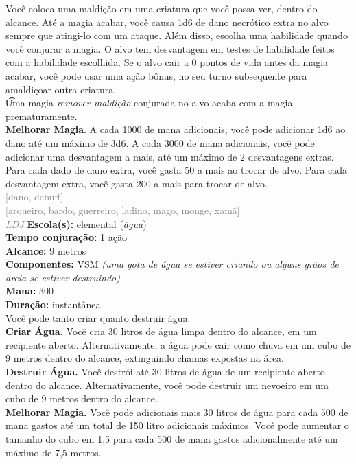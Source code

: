\documentclass{RPG_Adventure}[2021/10/20]
\begin{document}
{\normalsize Você coloca uma maldição em uma criatura que você possa ver, dentro do alcance. Até a magia acabar, você causa 1d6 de dano necrótico extra no alvo sempre que atingi-lo com um ataque. Além disso, escolha uma habilidade quando você conjurar a magia. O alvo tem desvantagem em testes de habilidade feitos com a habilidade escolhida.  Se o alvo cair a 0 pontos de vida antes da magia acabar, você pode usar uma ação bônus, no seu turno subsequente para amaldiçoar outra criatura.\\\t Uma magia \textit{remover maldição} conjurada no alvo acaba com a magia prematuramente.\\\t \textbf{Melhorar Magia}. A cada 1000 de mana adicionais, você pode adicionar 1d6 ao dano até um máximo de 3d6. A cada 3000 de mana adicionais, você pode adicionar uma desvantagem a mais, até um máximo de 2 desvantagens extras. Para cada dado de dano extra, você gasta 50 a mais ao trocar de alvo. Para cada desvantagem extra, você gasta 200 a mais para trocar de alvo.\\}
{\scriptsize \textcolor{gray}{[dano, debuff]\\}}
{\scriptsize \textcolor{gray}{[arqueiro, bardo, guerreiro, ladino, mago, monge, xamã]\\}}
{\tiny \textcolor{gray}{\textit{LDJ}}}\jump{}
{\small \t \textbf{Escola(s):} elemental (\textit{água})\\\t \textbf{Tempo conjuração:} 1 ação\\\t \textbf{Alcance:} 9 metros\\\t \textbf{Componentes:} VSM \textit{(uma gota de água se estiver criando ou alguns grãos de areia se estiver destruindo)}\\\t \textbf{Mana:} 300\\\t \textbf{Duração:} instantânea\\}
{\normalsize Você pode tanto criar quanto destruir água.\\\t \textbf{Criar Água.} Você cria 30 litros de água limpa dentro do alcance, em um recipiente aberto. Alternativamente, a água pode cair como chuva em um cubo de 9 metros dentro do alcance, extinguindo chamas expostas na área.\\\t \textbf{Destruir Água.} Você destrói até 30 litros de água de um recipiente aberto dentro do alcance. Alternativamente, você pode destruir um nevoeiro em um cubo de 9 metros dentro do alcance.\\\t \textbf{Melhorar Magia.} Você pode adicionais mais 30 litros de água para cada 500 de mana gastos até um total de 150 litro adicionais máximos. Você pode aumentar o tamanho do cubo em 1,5 para cada 500 de mana gastos adicionalmente até um máximo de 7,5 metros.\\}
\end{document}
